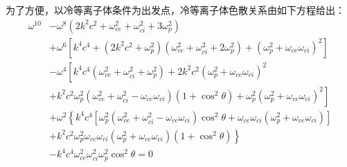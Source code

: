 为了方便，以冷等离子体条件为出发点，冷等离子体色散关系由如下方程给出\cite{RN1595}：
\begin{equation}\label{eq:dispw}
\begin{aligned}
\omega^{10} & -\omega^{8}\left(2 k^{2} c^{2}+\omega_{c e}^{2}+\omega_{c i}^{2}+3 \omega_{p}^{2}\right) \\& +\omega^{6}\left[k^{4} c^{4}+\left(2 k^{2} c^{2}+\omega_{p}^{2}\right)\left(\omega_{c e}^{2}+\omega_{c i}^{2}+2 \omega_{p}^{2}\right)+\left(\omega_{p}^{2}+\omega_{c e} \omega_{c i}\right)^{2}\right] \\& -\omega^{4}\left[k^{4} c^{4}\left(\omega_{c e}^{2}+\omega_{c i}^{2}+\omega_{p}^{2}\right)+2 k^{2} c^{2}\left(\omega_{p}^{2}+\omega_{c e} \omega_{c i}\right)^{2}\right. \\& \left.+k^{2} c^{2} \omega_{p}^{2}\left(\omega_{c e}^{2}+\omega_{c i}^{2}-\omega_{c e} \omega_{c i}\right)\left(1+\cos ^{2} \theta\right)+\omega_{p}^{2}\left(\omega_{p}^{2}+\omega_{c e} \omega_{c i}\right)^{2}\right] \\& +\omega^{2}\left\{k^{4} c^{4}\left[\omega_{p}^{2}\left(\omega_{c e}^{2}+\omega_{c i}^{2}-\omega_{c e} \omega_{c i}\right) \cos ^{2} \theta+\omega_{c e} \omega_{c i}\left(\omega_{p}^{2}+\omega_{c e} \omega_{c i}\right)\right]\right. \\& \left.+k^{2} c^{2} \omega_{p}^{2} \omega_{c e} \omega_{c i}\left(\omega_{p}^{2}+\omega_{c e} \omega_{c i}\right)\left(1+\cos ^{2} \theta\right)\right\} \\& -k^{4} c^{4} \omega_{c e}^{2} \omega_{c i}^{2} \omega_{p}^{2} \cos ^{2} \theta  = 0
\end{aligned}
\end{equation}
